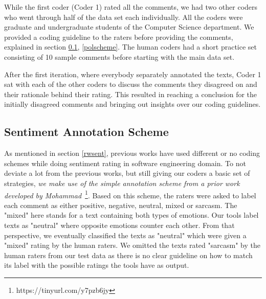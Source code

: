 While the first coder (Coder 1) rated all the comments, 
we had two other coders 
who went through half of the data set each individually. 
All the coders were graduate and undergraduate students 
of the Computer Science department. 
We provided a coding guideline 
to the raters before providing the comments, 
explained in section \ref{sentscheme}, \ref{polscheme}. 
The human coders had a short practice set 
consisting of 10 sample comments 
before starting with the main data set.

After the first iteration, 
where everybody separately annotated the texts, 
Coder 1 sat with each of the other coders 
to discuss the comments they disagreed on 
and their rationale behind their rating. 
This resulted in reaching a conclusion 
for the initially disagreed comments 
and bringing out insights over our coding guidelines.

\subsection{Sentiment Annotation Scheme}\label{sentscheme}


As mentioned in section \ref{rwsent}, previous works have used different or no coding schemes while doing sentiment rating in software engineering domain. To not deviate a lot from the previous works, but still giving our coders a basic set of strategies, 
\textit{we make use of the simple annotation scheme 
from a prior work developed by Mohammad}~\cite{mohammad2016practical}\footnote{https://tinyurl.com/y7pzb6jy}. 
Based on this scheme, the raters were asked to label each comment as either positive, negative, neutral, mixed or sarcasm. The "mixed" here stands for a text containing both types of emotions. Our tools label texts as "neutral" where opposite emotions counter each other. From that perspective, we eventually classified the texts as "neutral" which were given a "mixed" rating by the human raters. We omitted the texts rated "sarcasm" by the human raters from our test data as there is no clear guideline on how to match its label with the possible ratings the tools have as output. 

